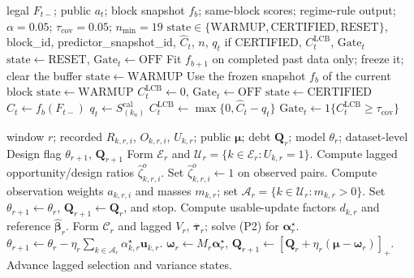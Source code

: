\documentclass[letterpaper,journal]{IEEEtran}
\begin{document}
\begin{algorithm}[t]
\caption{Aggregate coverage certificate (formal Gate object)}
\label{alg:agg_certificate}
\begin{algorithmic}[1]
\REQUIRE legal $F_{t-}$; public $a_t$; block snapshot $f_b$; same-block scores;
regime-rule output; $\alpha=0.05$; $\tau_{\mathrm{cov}}=0.05$; $n_{\min}=19$
\ENSURE $\mathrm{state}\in\{\mathrm{WARMUP},\mathrm{CERTIFIED},\mathrm{RESET}\}$,
block\_id, predictor\_snapshot\_id, $\widehat C_t$, $n$, $q_t$ if CERTIFIED,
$C^{\mathrm{LCB}}_t$, $\mathrm{Gate}_t$
\STATE $\mathrm{state}\leftarrow\mathrm{RESET}$, $\mathrm{Gate}_t\leftarrow\mathrm{OFF}$
\STATE Fit $f_{b+1}$ on completed past data only; freeze it; clear the buffer
\STATE $\mathrm{state}\leftarrow\mathrm{WARMUP}$
\ELSE
\STATE Use the frozen snapshot $f_b$ of the current block
\STATE $\mathrm{state}\leftarrow\mathrm{WARMUP}$
\STATE $C^{\mathrm{LCB}}_t\leftarrow 0$, $\mathrm{Gate}_t\leftarrow\mathrm{OFF}$
\ELSE
\STATE $\mathrm{state}\leftarrow\mathrm{CERTIFIED}$ 
\STATE $\widehat C_t\leftarrow f_b(F_{t-})$
\STATE $q_t\leftarrow S_{(k_n)}^{\mathrm{cal}}$ 
\STATE $C^{\mathrm{LCB}}_t\leftarrow\max\{0,\widehat C_t-q_t\}$
\STATE $\mathrm{Gate}_t\leftarrow 1\{C^{\mathrm{LCB}}_t\ge\tau_{\mathrm{cov}}\}$
\ENDIF
\ENDIF
\end{algorithmic}
\end{algorithm}

\begin{algorithm}[t]
\caption{Window-close RAVEN-MCS aggregation}
\label{alg:window_close}
\begin{algorithmic}[1]
\REQUIRE window $r$; recorded $R_{k,r,i}$, $O_{k,r,i}$, $U_{k,r}$;
public $\boldsymbol\mu$; debt $\mathbf{Q}_r$; model $\theta_r$;
dataset-level Design flag
\ENSURE $\theta_{r+1}$, $\mathbf{Q}_{r+1}$
\STATE Form $\mathcal{E}_r$ and
$\mathcal{U}_r=\{k\in\mathcal{E}_r:U_{k,r}=1\}$.
\STATE Compute lagged opportunity/design ratios
$\widehat\zeta^{o}_{k,r,i}$.
\ELSE
\STATE Set $\widehat\zeta^{o}_{k,r,i}\leftarrow 1$ on observed pairs.
\ENDIF
\STATE Compute observation weights $a_{k,r,i}$ and masses $m_{k,r}$;
set $\mathcal{A}_r=\{k\in\mathcal{U}_r:m_{k,r}>0\}$.
\STATE Set $\theta_{r+1}\leftarrow\theta_r$,
$\mathbf{Q}_{r+1}\leftarrow\mathbf{Q}_r$, and stop.
\ELSE
\STATE Compute usable-update factors $d_{k,r}$ and reference
$\widehat{\boldsymbol\beta}_r$.
\STATE Form $\mathcal{C}_r$ and lagged $V_r$,
$\overline{\boldsymbol\tau}_r$; solve (P2) for
$\boldsymbol\alpha_r^\star$.
\STATE $\theta_{r+1}\leftarrow\theta_r
-\eta_r\sum_{k\in\mathcal{A}_r}\alpha^\star_{k,r}\mathbf{u}_{k,r}$.
\STATE $\boldsymbol\omega_r\leftarrow M_r\boldsymbol\alpha_r^\star$,
$\mathbf{Q}_{r+1}\leftarrow
[\mathbf{Q}_r+\eta_r(\boldsymbol\mu-\boldsymbol\omega_r)]_+$.
\STATE Advance lagged selection and variance states.
\ENDIF
\end{algorithmic}
\end{algorithm}
\end{document}
